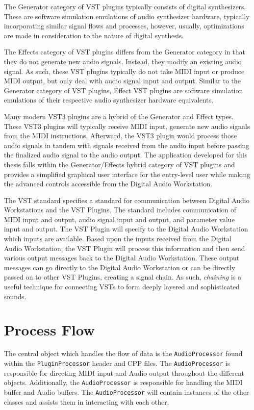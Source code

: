 \documentclass[a4paper,12pt]{report}
\begin{document}
The Generator category of VST plugins typically consists of digital synthesizers. These are software simulation emulations of audio synthesizer hardware, typically incorporating similar signal flows and processes, however, usually, optimizations are made in consideration to the nature of digital synthesis. 

The Effects category of VST plugins differs from the Generator category in that they do not generate new audio signals. Instead, they modify an existing audio signal. As such, these VST plugins typically do not take MIDI input or produce MIDI output, but only deal with audio signal input and output. Similar to the Generator category of VST plugins, Effect VST plugins are software simulation emulations of their respective audio synthesizer hardware equivalents.

Many modern VST3 plugins are a hybrid of the Generator and Effect types. These VST3 plugins will typically receive MIDI input, generate new audio signals from the MIDI instructions. Afterward, the VST3 plugin would process those audio signals in tandem with signals received from the audio input before passing the finalized audio signal to the audio output. The application developed for this thesis falls within the Generator/Effects hybrid category of VST plugins and provides a simplified graphical user interface for the entry-level user while making the advanced controls accessible from the Digital Audio Workstation.

The VST standard specifies a standard for communication between Digital Audio Workstations and the VST Plugins. The standard includes communication of MIDI input and output, audio signal input and output, and parameter value input and output. The VST Plugin will specify to the Digital Audio Workstation which inputs are available. Based upon the inputs received from the Digital Audio Workstation, the VST Plugin will process this information and then send various output messages back to the Digital Audio Workstation. These output messages can go directly to the Digital Audio Workstation or can be directly passed on to other VST Plugins, creating a signal chain. As such, \emph{chaining} is a useful technique for connecting VSTs to form deeply layered and sophisticated sounds.

\section{Process Flow}
The central object which handles the flow of data is the \texttt{AudioProcessor} found within the \texttt{PluginProcessor} header and CPP files. The \texttt{AudioProcessor} is responsible for directing MIDI input and Audio output throughout the different objects. Additionally, the \texttt{AudioProcessor} is responsible for handling the MIDI buffer and Audio buffers. The \texttt{AudioProcessor} will contain instances of the other classes and assists them in interacting with each other.
\end{document}
